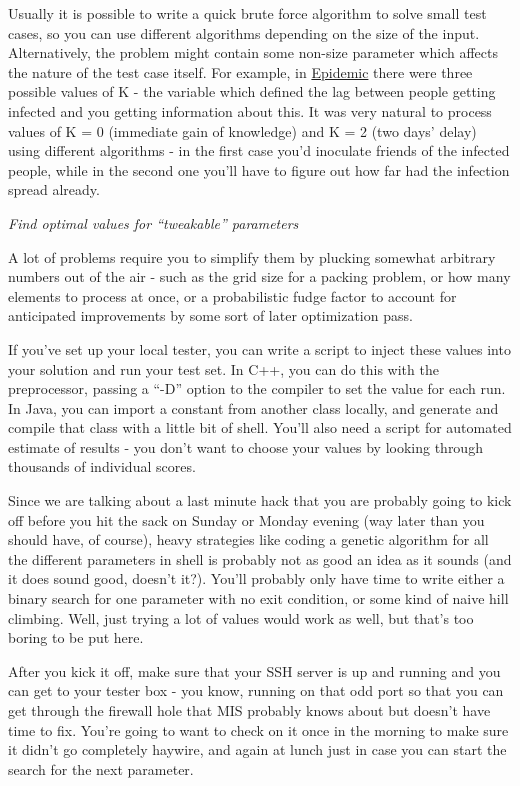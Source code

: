 Usually it is possible to write a quick brute force algorithm to solve
small test cases, so you can use different algorithms depending on the
size of the input. Alternatively, the problem might contain some
non-size parameter which affects the nature of the test case itself. For
example, in
\href{http://www.topcoder.com/longcontest/?module=ViewProblemStatement\&rd=11131\&pm=8632}{Epidemic}
there were three possible values of K - the variable which defined the
lag between people getting infected and you getting information about
this. It was very natural to process values of K = 0 (immediate gain of
knowledge) and K = 2 (two days' delay) using different algorithms - in
the first case you'd inoculate friends of the infected people, while in
the second one you'll have to figure out how far had the infection
spread already.

\emph{Find optimal values for ``tweakable'' parameters}

A lot of problems require you to simplify them by plucking somewhat
arbitrary numbers out of the air - such as the grid size for a packing
problem, or how many elements to process at once, or a probabilistic
fudge factor to account for anticipated improvements by some sort of
later optimization pass.

If you've set up your local tester, you can write a script to inject
these values into your solution and run your test set. In C++, you can
do this with the preprocessor, passing a ``-D'' option to the compiler
to set the value for each run. In Java, you can import a constant from
another class locally, and generate and compile that class with a little
bit of shell. You'll also need a script for automated estimate of
results - you don't want to choose your values by looking through
thousands of individual scores.

Since we are talking about a last minute hack that you are probably
going to kick off before you hit the sack on Sunday or Monday evening
(way later than you should have, of course), heavy strategies like
coding a genetic algorithm for all the different parameters in shell is
probably not as good an idea as it sounds (and it does sound good,
doesn't it?). You'll probably only have time to write either a binary
search for one parameter with no exit condition, or some kind of naive
hill climbing. Well, just trying a lot of values would work as well, but
that's too boring to be put here.

After you kick it off, make sure that your SSH server is up and running
and you can get to your tester box - you know, running on that odd port
so that you can get through the firewall hole that MIS probably knows
about but doesn't have time to fix. You're going to want to check on it
once in the morning to make sure it didn't go completely haywire, and
again at lunch just in case you can start the search for the next
parameter.
